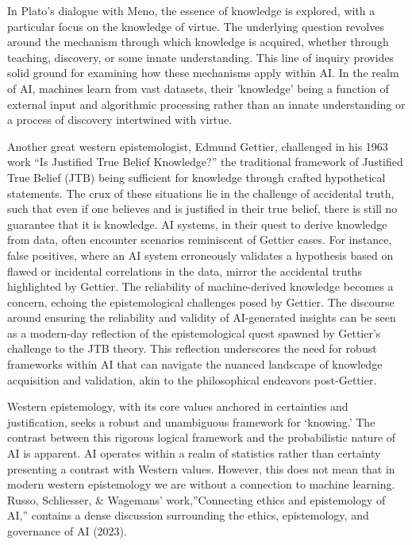\documentclass[
	a4paper, %
	10pt, %
	unnumberedsections, %
	twoside, %
]{LTJournalArticle}
\begin{document}
In Plato's dialogue with Meno, the essence of knowledge is explored, with a particular focus on the knowledge of virtue. The underlying question revolves around the mechanism through which knowledge is acquired, whether through teaching, discovery, or some innate understanding. This line of inquiry provides solid ground for examining how these mechanisms apply within AI. In the realm of AI, machines learn from vast datasets, their 'knowledge' being a function of external input and algorithmic processing rather than an innate understanding or a process of discovery intertwined with virtue.

Another great western epistemologist, Edmund Gettier, challenged in his 1963 work “Is Justified True Belief Knowledge?” the traditional framework of Justified True Belief (JTB) being sufficient for knowledge through crafted hypothetical statements. The crux of these situations lie in the challenge of accidental truth, such that even if one believes and is justified in their true belief, there is still no guarantee that it is knowledge. AI systems, in their quest to derive knowledge from data, often encounter scenarios reminiscent of Gettier cases. For instance, false positives, where an AI system erroneously validates a hypothesis based on flawed or incidental correlations in the data, mirror the accidental truths highlighted by Gettier. The reliability of machine-derived knowledge becomes a concern, echoing the epistemological challenges posed by Gettier. The discourse around ensuring the reliability and validity of AI-generated insights can be seen as a modern-day reflection of the epistemological quest spawned by Gettier's challenge to the JTB theory. This reflection underscores the need for robust frameworks within AI that can navigate the nuanced landscape of knowledge acquisition and validation, akin to the philosophical endeavors post-Gettier.

Western epistemology, with its core values anchored in certainties and justification, seeks a robust and unambiguous framework for ‘knowing.’ The contrast between this rigorous logical framework and the probabilistic nature of AI is apparent. AI operates within a realm of statistics rather than certainty presenting a contrast with Western values. However, this does not mean that in modern western epistemology we are without a connection to machine learning. Russo, Schliesser, \& Wagemans’ work,”Connecting ethics and epistemology of AI,” contains a dense discussion surrounding the ethics, epistemology, and governance of AI (2023).\\
\end{document}
